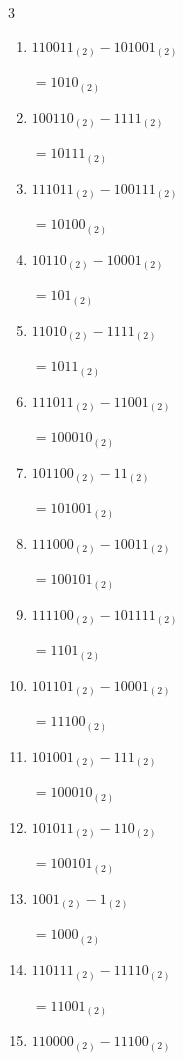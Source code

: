 \begin{multicols}{3}
\begin{enumerate}
  \item $110011_{(2)} - 101001_{(2)}$

        $=1010_{(2)}$

  \item $100110_{(2)} - 1111_{(2)}$

        $=10111_{(2)}$

  \item $111011_{(2)} - 100111_{(2)}$

        $=10100_{(2)}$

  \item $10110_{(2)} - 10001_{(2)}$

        $=101_{(2)}$

  \item $11010_{(2)} - 1111_{(2)}$

        $=1011_{(2)}$

  \item $111011_{(2)} - 11001_{(2)}$

        $=100010_{(2)}$

  \item $101100_{(2)} - 11_{(2)}$

        $=101001_{(2)}$

\columnbreak %

  \item $111000_{(2)} - 10011_{(2)}$

        $=100101_{(2)}$

  \item $111100_{(2)} - 101111_{(2)}$

        $=1101_{(2)}$

  \item $101101_{(2)} - 10001_{(2)}$

        $=11100_{(2)}$

  \item $101001_{(2)} - 111_{(2)}$

        $=100010_{(2)}$

  \item $101011_{(2)} - 110_{(2)}$

        $=100101_{(2)}$

  \item $1001_{(2)} - 1_{(2)}$

        $=1000_{(2)}$

  \item $110111_{(2)} - 11110_{(2)}$

        $=11001_{(2)}$

  \item $110000_{(2)} - 11100_{(2)}$


\end{enumerate}
\end{multicols}
